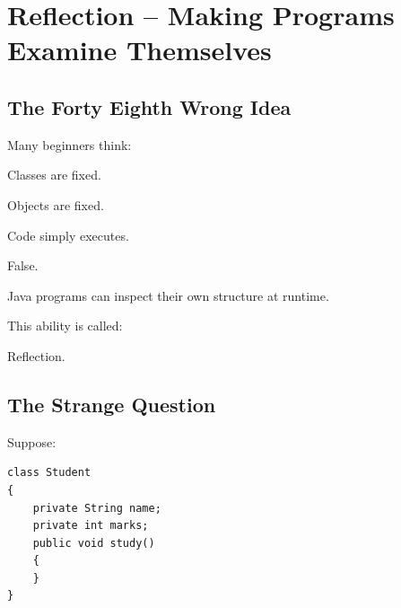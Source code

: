 \documentclass[11pt,a4paper]{book}
\begin{document}
\chapter{Reflection -- Making Programs Examine Themselves}

\section{The Forty Eighth Wrong Idea}

\begin{trap}

Many beginners think:


Classes are fixed.


Objects are fixed.


Code simply executes.


False.


Java programs can inspect
their own structure at runtime.


This ability is called:


Reflection.

\end{trap}

\section{The Strange Question}

Suppose:

\begin{verbatim} 
class Student
{
    private String name;
    private int marks;
    public void study()
    {
    }
}
\end{verbatim}
\end{document}
